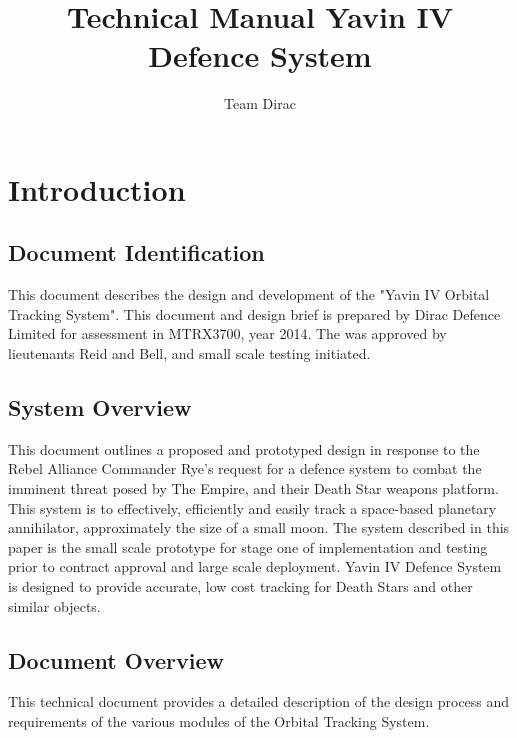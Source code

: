 \documentclass[]{report}
\title{Technical Manual \newline Yavin IV Defence System}
\author{Team Dirac}
\begin{document}
\maketitle

\chapter{Introduction}
\section{Document Identification}
This document describes the design and development of the "Yavin IV Orbital Tracking System".  This document and design brief is prepared by Dirac Defence Limited for assessment in MTRX3700, year 2014. The was approved by lieutenants Reid and Bell, and small scale testing initiated.

\section{System Overview}

This document outlines a proposed and prototyped design in response to the Rebel Alliance Commander Rye's request for a defence system to combat the imminent threat posed by The Empire, and their Death Star weapons platform. This system is to effectively, efficiently and easily track a space-based planetary annihilator, approximately the size of a small moon.\newline
The system described in this paper is the small scale prototype for stage one of implementation and testing prior to contract approval and large scale deployment. Yavin IV Defence System is designed to provide accurate, low cost tracking for Death Stars and other similar objects.

\section{Document Overview}

This technical document provides a detailed description of the design process and requirements of the various modules of the Orbital Tracking System. \newline
\end{document}
